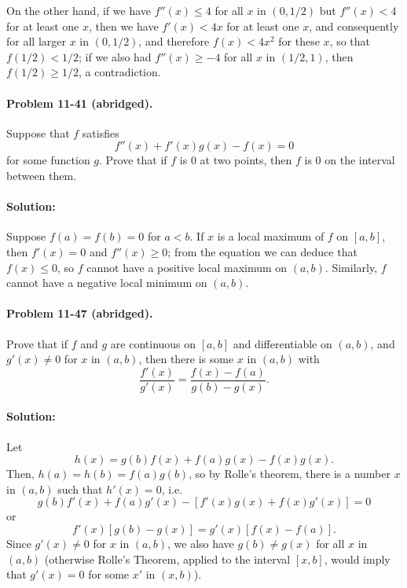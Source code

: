 \documentclass{article}
\begin{document}
On the other hand, if we have $f''(x) \leq 4$ for all $x$ in $(0, 1/2)$ but
$f''(x) < 4$ for at least one $x$, then we have $f'(x) < 4x$ for at least one
$x$, and consequently for all larger $x$ in $(0, 1/2)$, and therefore $f(x) <
4x^2$ for these $x$, so that $f(1/2) < 1/2$; if we also had $f''(x) \geq -4$
for all $x$ in $(1/2, 1)$, then $f(1/2) \geq 1/2$, a contradiction.

\paragraph{Problem 11-41 (abridged).} Suppose that $f$ satisfies
\begin{equation*}
  f''(x) + f'(x)g(x) - f(x) = 0
\end{equation*} for some function $g$. Prove that if $f$ is 0 at two points,
then $f$ is 0 on the interval between them.

\paragraph{Solution:} Suppose $f(a) = f(b) = 0$ for $a < b$. If $x$ is a local
maximum of $f$ on $[a, b]$, then $f'(x) = 0$ and $f''(x) \geq 0$; from the
equation we can deduce that $f(x) \leq 0$, so $f$ cannot have a positive local
maximum on $(a, b)$. Similarly, $f$ cannot have a negative local minimum on
$(a, b)$.

\paragraph{Problem 11-47 (abridged).} Prove that if $f$ and $g$ are continuous
on $[a, b]$ and differentiable on $(a, b)$, and $g'(x) \neq 0$ for $x$ in $(a,
b)$, then there is some $x$ in $(a, b)$ with \begin{equation*}
  \frac{f'(x)}{g'(x)} = \frac{f(x) - f(a)}{g(b) - g(x)}.
\end{equation*}

\paragraph{Solution:} Let \begin{equation*}
  h(x) = g(b)f(x) + f(a)g(x) - f(x)g(x).
\end{equation*} Then, $h(a) = h(b) = f(a)g(b)$, so by Rolle's theorem, there is
a number $x$ in $(a, b)$ such that $h'(x) = 0$, i.e. \begin{equation*}
  g(b)f'(x) + f(a)g'(x) - [f'(x)g(x) + f(x)g'(x)] = 0
\end{equation*} or \begin{equation*}
  f'(x)[g(b) - g(x)] = g'(x)[f(x) - f(a)].
\end{equation*} Since $g'(x) \neq 0$ for $x$ in $(a, b)$, we also have $g(b)
\neq g(x)$ for all $x$ in $(a, b)$ (otherwise Rolle's Theorem, applied to the
interval $[x, b]$, would imply that $g'(x) = 0$ for some $x'$ in $(x, b)$).
\end{document}

